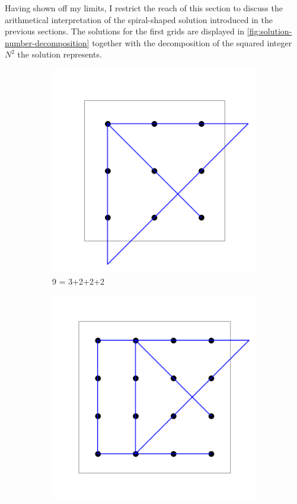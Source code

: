 \documentclass[11pt]{article}
\begin{document}
Having shown off my limits, I restrict the reach of this section to discuss the arithmetical interpretation of the spiral-shaped solution introduced in the previous sections. The solutions for the first grids are displayed in \autoref{fig:solution-number-decomposition} together with the decomposition of the squared integer $N^2$ the solution represents.
\begin{figure}
\begin{subfigure}[b]{.3\linewidth}
\includegraphics[width=\linewidth]{images/9-dots-solution.png}
\caption{9 = 3+2+2+2}\label{fig-a}
\end{subfigure}
\hfill
\begin{subfigure}[b]{.3\linewidth}
\includegraphics[width=\linewidth]{images/4x4_grid_iteration_solution.png}

\end{subfigure}
\end{figure}
\end{document}
